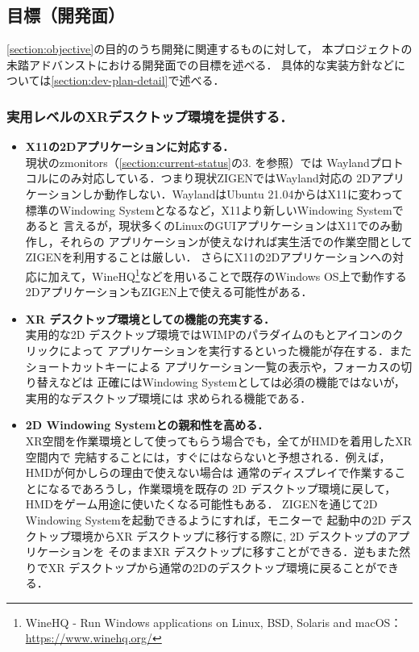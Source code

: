 \subsection{目標（開発面）}
\label{section:dev-goal}

\ref*{section:objective}の目的のうち開発に関連するものに対して，
本プロジェクトの未踏アドバンストにおける開発面での目標を述べる．
具体的な実装方針などについては\ref{section:dev-plan-detail}で述べる．

\subsubsection*{実用レベルのXRデスクトップ環境を提供する．}

\begin{itemize}
  \item \textbf{X11の2Dアプリケーションに対応する．}\\
        現状のzmonitors（\ref{section:current-status}の3. を参照）では %
        Waylandプロトコルにのみ対応している．つまり現状ZIGENではWayland対応の
        2Dアプリケーションしか動作しない．WaylandはUbuntu 21.04からはX11に変わって
        標準のWindowing Systemとなるなど，X11より新しいWindowing Systemであると
        言えるが，現状多くのLinuxのGUIアプリケーションはX11でのみ動作し，それらの
        アプリケーションが使えなければ実生活での作業空間としてZIGENを利用することは厳しい．
        さらにX11の2Dアプリケーションへの対応に加えて，WineHQ\footnote{WineHQ - Run Windows applications on Linux, BSD, Solaris and macOS：\url{https://www.winehq.org/}}などを用いることで既存のWindows OS上で動作する2DアプリケーションもZIGEN上で使える可能性がある．
  \item \textbf{XR デスクトップ環境としての機能の充実する．}\\
        実用的な2D デスクトップ環境ではWIMPのパラダイムのもとアイコンのクリックによって
        アプリケーションを実行するといった機能が存在する．またショートカットキーによる
        アプリケーション一覧の表示や，フォーカスの切り替えなどは
        正確にはWindowing Systemとしては必須の機能ではないが，実用的なデスクトップ環境には
        求められる機能である．

  \item \textbf{2D Windowing Systemとの親和性を高める．}\\
        XR空間を作業環境として使ってもらう場合でも，全てがHMDを着用したXR空間内で
        完結することには，すぐにはならないと予想される．例えば，HMDが何かしらの理由で使えない場合は
        通常のディスプレイで作業することになるであろうし，作業環境を既存の
        2D デスクトップ環境に戻して，HMDをゲーム用途に使いたくなる可能性もある．
        ZIGENを通じて2D Windowing Systemを起動できるようにすれば，モニターで
        起動中の2D デスクトップ環境からXR デスクトップに移行する際に, 2D デスクトップのアプリケーションを
        そのままXR デスクトップに移すことができる．逆もまた然りでXR デスクトップから通常の2Dのデスクトップ環境に戻ることができる．
\end{itemize}

